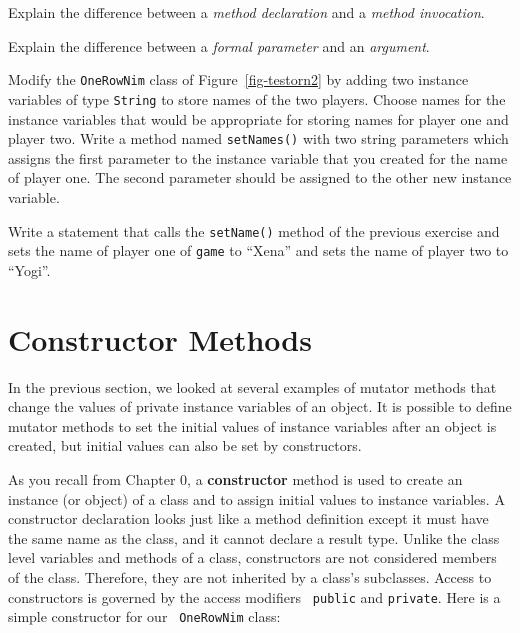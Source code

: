 \label{self-study-exercises}
\begin{SSTUDY}
\item  Explain the difference between a {\it  method declaration} and
a {\it method invocation}.

\item  Explain the difference between a {\it formal parameter} and
an {\it argument}.

\item  Modify the {\tt OneRowNim} class of Figure~\ref{fig-testorn2}
by adding two instance variables of type {\tt String} to store names
of the two players. Choose names for the instance variables that would
be appropriate for storing names for player one and player two.  Write
a method named {\tt setNames()} with two string parameters which
assigns the first parameter to the instance variable that you created
for the name of player one.  The second parameter should be assigned
to the other new instance variable.

\item  Write a statement that calls the {\tt setName()} method of
the previous exercise and sets the name of player one of {\tt game}
to ``Xena'' and sets the name of player two to ``Yogi''.
\end{SSTUDY}

\section{Constructor Methods}
\label{sec-constructors}
\noindent In the previous section, we looked at several examples of 
mutator methods that change the values of private instance variables
of an object.  It is possible to define mutator methods to set the
initial values of instance variables after an object is created, but
initial values can also be set by constructors.

As you recall from Chapter 0, a {\bf constructor}
method is used to create an
instance (or object) of a class and to assign initial values to
instance variables.  A constructor declaration looks just like a
method definition except it must have the same name as the class, and
it cannot declare a result type.  Unlike the class level variables and
methods of a class, constructors are not considered members of the
class.  Therefore, they are not inherited by a class's subclasses.
Access to constructors is governed by the access modifiers {\tt
public} and {\tt private}.  Here is a simple constructor for our {\tt
OneRowNim} class:

